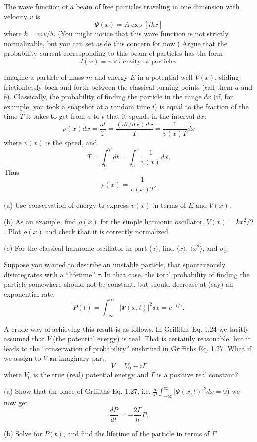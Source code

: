 \documentclass{article}
\begin{document}
\newpage

\begin{ques}\label{q5}
The wave function of a beam of free particles traveling in one dimension with velocity $v$ is
\[
\Psi(x) = A \exp [ikx]
\]
where $k = mv/\hbar$. (You might notice that this wave function is not strictly normalizable, but
you can set aside this concern for now.) Argue that the probability current corresponding
to this beam of particles has the form
\[
J(x) = v \times \text{density of particles}.
\]
\end{ques}

\begin{ques}\label{q6}
Imagine a particle of mass $m$ and energy $E$ in a potential well $V (x)$, sliding frictionlessly
back and forth between the classical turning points (call them $a$ and $b$). Classically, the
probability of finding the particle in the range $dx$ (if, for example, you took a snapshot at
a random time $t$) is equal to the fraction of the time $T$ it takes to get from $a$ to $b$ that it
spends in the interval $dx$:
\[
\rho(x)dx = \frac{dt}{T} = \frac{(dt/dx)dx}{T} = \frac{1}{v(x)T} dx
\]
where $v(x)$ is the speed, and
\[
T = \int_0^T dt = \int_a^b \frac{1}{v(x)} dx .
\]
Thus
\[
\rho(x) = \frac{1}{v(x)T}.
\]

(a) Use conservation of energy to express $v(x)$ in terms of $E$ and $V(x)$.

(b) As an example, find $\rho(x)$ for the simple harmonic oscillator, $V(x) = kx^2/2$. Plot $\rho(x)$
and check that it is correctly normalized.

(c) For the classical harmonic oscillator in part (b), find $\langle x\rangle$, $\langle x^2\rangle$, and $\sigma_x$.
\end{ques}

\begin{ques}\label{q7}
Suppose you wanted to describe an unstable particle, that spontaneously disintegrates with
a “lifetime” $\tau$. In that case, the total probability of finding the particle somewhere should
not be constant, but should decrease at (say) an exponential rate:
\[
P (t) = \int_{-\infty}^{\infty} |\Psi(x, t)|^2 dx = e^{-t/\tau}.
\]

A crude way of achieving this result is as follows. In Griffiths Eq. 1.24 we tacitly assumed
that $V$ (the potential energy) is real. That is certainly reasonable, but it leads to the
“conservation of probability” enshrined in Griffiths Eq. 1.27. What if we assign to $V$ an
imaginary part,
\[
V = V_0 - i\Gamma
\]
where $V_0$ is the true (real) potential energy and $\Gamma$ is a positive real constant?

(a) Show that (in place of Griffiths Eq. 1.27, i.e.
$\tfrac{d}{dt}\int_{-\infty}^\infty |\Psi(x, t)|^2dx = 0$) we now get
\[
\frac{dP}{dt} = -\frac{2\Gamma}{\hbar}P.
\]

(b) Solve for $P(t)$, and find the lifetime of the particle in terms of $\Gamma$.
\end{ques}
\end{document}
